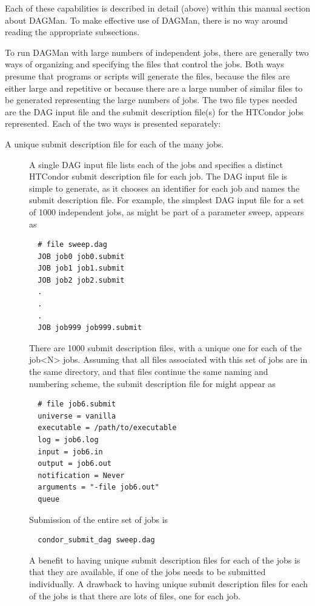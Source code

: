 Each of these capabilities is described in detail (above)
within this manual section about DAGMan.
To make effective use of DAGMan, there is no way around reading the 
appropriate subsections.

To run DAGMan with large numbers of independent jobs,
there are generally two ways of organizing and specifying the
files that control the jobs.
Both ways presume that programs or scripts will generate the files,
because the files are either large and repetitive
or because there are a large number of similar files to be
generated representing the large numbers of jobs.
The two file types needed are the DAG input file and the
submit description file(s) for the HTCondor jobs represented.
Each of the two ways is presented separately:

\begin{description}
\item[A unique submit description file for each of the many jobs.]
A single DAG input file lists each of the jobs and specifies
a distinct HTCondor submit description file for each job.
The DAG input file is simple to generate, as it chooses an
identifier for each job and names the submit description file.
For example, the simplest DAG input file for a set of 1000 independent jobs,
as might be part of a parameter sweep, appears as
\begin{verbatim}
  # file sweep.dag
  JOB job0 job0.submit
  JOB job1 job1.submit
  JOB job2 job2.submit
  .
  .
  .
  JOB job999 job999.submit
\end{verbatim}
There are 1000 submit description files, with a unique one for
each of the job<N> jobs.
Assuming that all files associated with this set of jobs are in the
same directory, and that files continue the same naming and numbering
scheme, the submit description file for 
might appear as
\begin{verbatim}
  # file job6.submit
  universe = vanilla
  executable = /path/to/executable
  log = job6.log
  input = job6.in
  output = job6.out
  notification = Never
  arguments = "-file job6.out"
  queue
\end{verbatim}

Submission of the entire set of jobs is
\begin{verbatim}
  condor_submit_dag sweep.dag
\end{verbatim}

A benefit to having unique submit description files for each of the
jobs is that they are available, if one of the jobs needs to be
submitted individually.
A drawback to having unique submit description files for each of the jobs
is that there are lots of files, one for each job.


\end{description}
